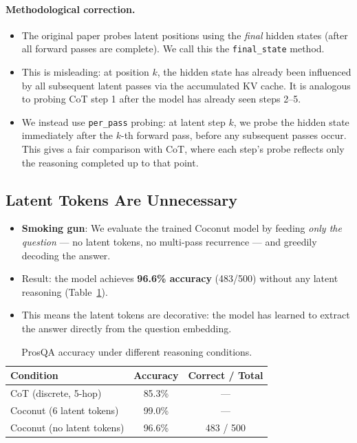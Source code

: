 \paragraph{Methodological correction.}
\begin{itemize}
    \item The original paper probes latent positions using the \emph{final} hidden states (after all forward passes are complete). We call this the \texttt{final\_state} method.
    \item This is misleading: at position $k$, the hidden state has already been influenced by all subsequent latent passes via the accumulated KV cache. It is analogous to probing CoT step 1 after the model has already seen steps 2--5.
    \item We instead use \texttt{per\_pass} probing: at latent step $k$, we probe the hidden state immediately after the $k$-th forward pass, before any subsequent passes occur. This gives a fair comparison with CoT, where each step's probe reflects only the reasoning completed up to that point.
\end{itemize}

\subsection{Latent Tokens Are Unnecessary}
\label{sec:coconut-nolatent}

\begin{itemize}
    \item \textbf{Smoking gun}: We evaluate the trained Coconut model by feeding \emph{only the question} — no latent tokens, no multi-pass recurrence — and greedily decoding the answer.
    \item Result: the model achieves \textbf{96.6\% accuracy} (483/500) without any latent reasoning (Table~\ref{tab:coconut-accuracy}).
    \item This means the latent tokens are decorative: the model has learned to extract the answer directly from the question embedding.
\end{itemize}

\begin{table}[h]
\centering
\caption{ProsQA accuracy under different reasoning conditions.}
\label{tab:coconut-accuracy}
\begin{tabular}{lcc}
\toprule
\textbf{Condition} & \textbf{Accuracy} & \textbf{Correct / Total} \\
\midrule
CoT (discrete, 5-hop)          & 85.3\% & --- \\
Coconut (6 latent tokens)      & 99.0\% & --- \\
Coconut (no latent tokens)     & 96.6\% & 483 / 500 \\
\bottomrule
\end{tabular}
\end{table}

